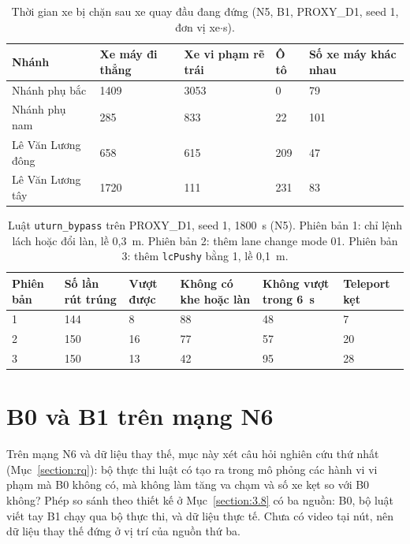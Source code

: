 \documentclass[../main.tex]{subfiles}
\begin{document}
\begin{table}[!htbp]
\centering
\small
\caption{Thời gian xe bị chặn sau xe quay đầu đang đứng (N5, B1, PROXY\_D1, seed 1, đơn vị xe$\cdot$s).} \label{table:4.uturn_block}
\begin{tabular}{|p{3.6cm}|p{2.6cm}|p{2.8cm}|p{1.6cm}|p{2.2cm}|}
\hline
\textbf{Nhánh} & \textbf{Xe máy đi thẳng} & \textbf{Xe vi phạm rẽ trái} & \textbf{Ô tô} & \textbf{Số xe máy khác nhau} \\ \hline
Nhánh phụ bắc & 1409 & 3053 & 0 & 79 \\ \hline
Nhánh phụ nam & 285 & 833 & 22 & 101 \\ \hline
Lê Văn Lương đông & 658 & 615 & 209 & 47 \\ \hline
Lê Văn Lương tây & 1720 & 111 & 231 & 83 \\ \hline
\end{tabular}
\end{table}

\begin{table}[!htbp]
\centering
\small
\caption{Luật \texttt{uturn\_bypass} trên PROXY\_D1, seed 1, 1800~s (N5). Phiên bản 1: chỉ lệnh lách hoặc đổi làn, lề 0,3~m. Phiên bản 2: thêm lane change mode 01. Phiên bản 3: thêm \texttt{lcPushy} bằng 1, lề 0,1~m.} \label{table:4.uturn_rule}
\begin{tabular}{|p{1.6cm}|p{1.9cm}|p{1.9cm}|p{2.4cm}|p{2.5cm}|p{1.9cm}|}
\hline
\textbf{Phiên bản} & \textbf{Số lần rút trúng} & \textbf{Vượt được} & \textbf{Không có khe hoặc làn} & \textbf{Không vượt trong 6~s} & \textbf{Teleport kẹt} \\ \hline
1 & 144 & 8 & 88 & 48 & 7 \\ \hline
2 & 150 & 16 & 77 & 57 & 20 \\ \hline
3 & 150 & 13 & 42 & 95 & 28 \\ \hline
\end{tabular}
\end{table}

\section{B0 và B1 trên mạng N6}
\label{section:compare_b0_b1_n6}
\label{subsection:ref_n1104}

Trên mạng N6 và dữ liệu thay thế, mục này xét câu hỏi nghiên cứu thứ nhất (Mục~\ref{section:rq}): bộ thực thi luật có tạo ra trong mô phỏng các hành vi vi phạm mà B0 không có, mà không làm tăng va chạm và số xe kẹt so với B0 không? Phép so sánh theo thiết kế ở Mục~\ref{section:3.8} có ba nguồn: B0, bộ luật viết tay B1 chạy qua bộ thực thi, và dữ liệu thực tế. Chưa có video tại nút, nên dữ liệu thay thế đứng ở vị trí của nguồn thứ ba.
\end{document}
